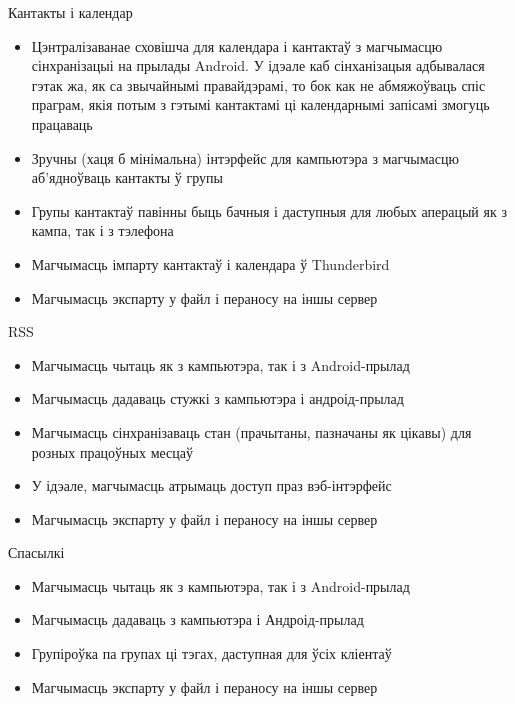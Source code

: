\documentclass[ignorenonframetext,hyperref={pdftex,unicode}]{beamer}
\begin{document}
\begin{frame}{Кантакты і календар}
	\begin{itemize}
		\item Цэнтралізаванае сховішча для календара і кантактаў з магчымасцю сінхранізацыі на прылады Android. У ідэале каб сінханізацыя адбывалася гэтак жа, як са звычайнымі правайдэрамі, то бок как не абмяжоўваць спіс праграм, якія потым з гэтымі кантактамі ці календарнымі запісамі змогуць працаваць \pause
		\item Зручны (хаця б мінімальна) інтэрфейс для кампьютэра з магчымасцю аб’ядноўваць кантакты ў групы \pause
		\item Групы кантактаў павінны быць бачныя і даступныя для любых аперацый як з кампа, так і з тэлефона \pause
		\item Магчымасць імпарту кантактаў і календара ў Thunderbird \pause
		\item Магчымасць экспарту у файл і пераносу на іншы сервер
	\end{itemize}
\end{frame}

\begin{frame}{RSS}
	\begin{itemize}
		\item Магчымасць чытаць як з кампьютэра, так і з Android-прылад \pause
		\item Магчымасць дадаваць стужкі з кампьютэра і андроід-прылад \pause
		\item Магчымасць сінхранізаваць стан (прачытаны, пазначаны як цікавы) для розных працоўных месцаў \pause
		\item У ідэале, магчымасць атрымаць доступ праз вэб-інтэрфейс \pause
		\item Магчымасць экспарту у файл і пераносу на іншы сервер
	\end{itemize}
\end{frame}

\begin{frame}{Спасылкі}
	\begin{itemize}
		\item Магчымасць чытаць як з кампьютэра, так і з Android-прылад \pause
		\item Магчымасць дадаваць з кампьютэра і Андроід-прылад \pause
		\item Групіроўка па групах ці тэгах, даступная для ўсіх кліентаў \pause
		\item Магчымасць экспарту у файл і пераносу на іншы сервер
	\end{itemize}
\end{frame}
\end{document}
